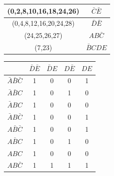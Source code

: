  


    \begin{table}[H]
        \begin{center}
            \def\arraystretch{1.5}
            \begin{tabular}{|c|c|}
                \hline
                (0,2,8,10,16,18,24,26) &	$\bar{C}\bar{E}$ \\
                \hline
                (0,4,8,12,16,20,24,28) & $\bar{D}\bar{E}$ \\
                \hline  
                (24,25,26,27) & $AB\bar{C}$ \\
                \hline   
                (7,23) & $\bar{B}CDE$ \\
                \hline           
                
            \end{tabular}
        \end{center}

    \end{table}


    
    \begin{table}[H]
        \begin{center}
            \def\arraystretch{1.5}
            \begin{tabular}{|c|c|c|c|c|}
                \hline
                &	$\bar{D}\bar{E}$ &	$\bar{D}E$ &	$D\bar{E}$ & $DE$ \\
                \hline
                $\bar{A}\bar{B}\bar{C}$ & 1 & 0 & 0 & 1 \\
                \hline          
                $\bar{A}\bar{B}C$ & 1 & 0 & 1 & 0 \\
                \hline   
                $\bar{A}BC$ & 1 & 0 & 0 & 0 \\
                \hline     
                $\bar{A}B\bar{C}$  & 1 & 0 & 0 & 1 \\
                \hline
                
                $A\bar{B}\bar{C}$ & 1 & 0 & 0 & 1 \\
                
                \hline
                
                $A\bar{B}C$ & 1 & 0 & 1 & 0 \\
                \hline
                
                $ABC$ & 1 & 0 & 0 & 0 \\
                \hline
                
                $AB\bar{C}$ & 1 & 1 & 1 & 1 \\
                \hline
                
            \end{tabular}
        \end{center}

    \end{table}



